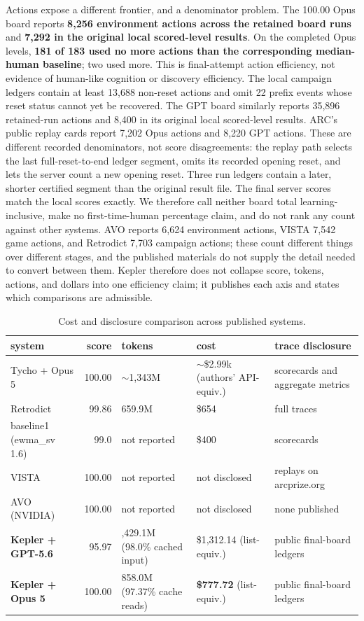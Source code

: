 \documentclass[11pt]{article}
\begin{document}
Actions expose a different frontier, and a denominator problem. The 100.00 Opus board reports \textbf{8,256 environment actions across the retained board runs} and \textbf{7,292 in the original local scored-level results}. On the completed Opus levels, \textbf{181 of 183 used no more actions than the corresponding median-human baseline}; two used more. This is final-attempt action efficiency, not evidence of human-like cognition or discovery efficiency. The local campaign ledgers contain at least 13,688 non-reset actions and omit 22 prefix events whose reset status cannot yet be recovered. The GPT board similarly reports 35,896 retained-run actions and 8,400 in its original local scored-level results. ARC's public replay cards report 7,202 Opus actions and 8,220 GPT actions. These are different recorded denominators, not score disagreements: the replay path selects the last full-reset-to-end ledger segment, omits its recorded opening reset, and lets the server count a new opening reset. Three run ledgers contain a later, shorter certified segment than the original result file. The final server scores match the local scores exactly. We therefore call neither board total learning-inclusive, make no first-time-human percentage claim, and do not rank any count against other systems. AVO reports 6,624 environment actions, VISTA 7,542 game actions, and Retrodict 7,703 campaign actions; these count different things over different stages, and the published materials do not supply the detail needed to convert between them. Kepler therefore does not collapse score, tokens, actions, and dollars into one efficiency claim; it publishes each axis and states which comparisons are admissible.

\begin{table}[ht]
  \centering
  \caption{Cost and disclosure comparison across published systems.}
  \label{tab:cost}
  \footnotesize
  \begin{tabularx}{\linewidth}{@{}p{3.2cm}r>{\raggedleft\arraybackslash}p{2.8cm}>{\raggedleft\arraybackslash}p{2.6cm}X@{}}
    \toprule
    system & score & tokens & cost & trace disclosure \\
    \midrule
    Tycho + Opus 5 & 100.00 & ${\sim}$1,343M & ${\sim}$\$2.99k (authors' API-equiv.) & scorecards and aggregate metrics \\
    Retrodict & 99.86 & 659.9M & \$654 & full traces \\
    baseline1 (ewma\_sv 1.6) & 99.0 & not reported & \$400 & scorecards \\
    VISTA & 100.00 & not reported & not disclosed & replays on arcprize.org \\
    AVO (NVIDIA) & 100.00 & not reported & not disclosed & none published \\
    \textbf{Kepler + GPT-5.6} & 95.97 & 2,429.1M (98.0\% cached input) & \$1,312.14 (list-equiv.) & public final-board ledgers \\
    \textbf{Kepler + Opus 5} & 100.00 & 858.0M (97.37\% cache reads) & \textbf{\$777.72} (list-equiv.) & public final-board ledgers \\
    \bottomrule
  \end{tabularx}
\end{table}
\end{document}
